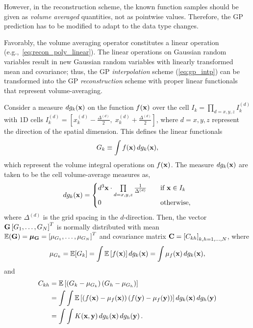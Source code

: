 However, in the reconstruction scheme, the known function samples should be given as \textit{volume averaged} quantities,
not as pointwise values. Therefore, the GP prediction has to be modified to adapt to the data type changes.

Favorably, the volume averaging operator constitutes a linear operation (e.g.,~\cref{eq:recon_poly_linear}).
The linear operations on Gaussian random variables result in new Gaussian random variables with
linearly transformed mean and covariance; thus, the GP \textit{interpolation} scheme (\cref{eq:gp_intp})
can be transformed into the GP \textit{reconstruction} scheme
with proper linear functionals that represent volume-averaging.

Consider a measure \( dg_{k} (\mathbf{x}) \) on the function \( f(\mathbf{x}) \) over the cell
\( I_{k} = \prod_{d = x,y,z} I_{k}^{(d)} \) with 1D cells
\( I_{k}^{(d)} = \left[ x_{k}^{(d)} - \frac{\Delta^{(d)}}{2},\; x_{k}^{(d)} + \frac{\Delta^{(d)}}{2} \right] \),
where \( d = x,y,z \) represent the direction of the spatial dimension.
This defines the linear functionals
\begin{equation}\label{eq:gp_vol_intg}
    G_{k} \equiv \int f (\mathbf{x}) \mathop{d g_{k}(\mathbf{x})},
\end{equation}
which represent the volume integral operations on \( f(\mathbf{x}) \).
The measure \( dg_{k} (\mathbf{x}) \) are taken to be the cell volume-average measures as,
\begin{equation}\label{eq:gp_dgk}
    dg_{k} (\mathbf{x}) = \begin{cases}
        d^{3} \mathbf{x} \cdot \prod\limits_{d = x,y,z} \frac{1}{\Delta^{(d)}} \quad &\text{if } \mathbf{x} \in I_{k} \\
        0 &\text{otherwise},
    \end{cases}
\end{equation}
where \( \Delta^{(d)} \) is the grid spacing in the \( d \)-direction.
Then, the vector \( \mathbf{G} \left[ G_{1}, \dots, G_{N} \right]^{T} \)
is normally distributed with mean \( \mathbb{E}(\mathbf{G}) = \bm{\mu}_{\mathbf{G}} = \left[ \mu_{G_{1}}, \dots, \mu_{G_{N}} \right]^{T} \)
and covariance matrix \( \mathbf{C} = \left[ C_{kh} \right]_{k,h = 1, \dots, N} \), where
\begin{equation}\label{eq:gp_mu_G}
    \mu_{G_{k}} = \mathbb{E} [G_{k}] = \int \mathbb{E} \left[ f(\mathbf{x}) \right] \mathop{d g_{k} (\mathbf{x})} = \int \mu_{f} (\mathbf{x}) \mathop{d g_{k} (\mathbf{x})},
\end{equation}
and
\begin{equation}\label{eq:gp_Ckh}
    \begin{split}
        C_{kh} &= \mathbb{E} \left[ \left( G_{k} - \mu_{G_{k}} \right) \left( G_{h} - \mu_{G_{h}} \right) \right] \\
               &= \int \int \mathbb{E} \left[ \left( f(\mathbf{x}) - \mu_{f} (\mathbf{x}) \right) \left( f(\mathbf{y}) - \mu_{f} (\mathbf{y}) \right)\right] \mathop{d g_{k}(\mathbf{x})} \mathop{d g_{h} (\mathbf{y})} \\
               &= \int \int K (\mathbf{x}, \mathbf{y}) \mathop{d g_{k} (\mathbf{x})} \mathop{d g_{h} (\mathbf{y})}.
    \end{split}
\end{equation}
